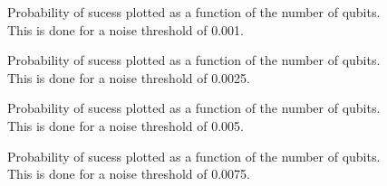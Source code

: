 
\begin{figure}
\begin{center}
\end{center}
\caption{Probability of sucess plotted as a function of the number of qubits. This
is done for a noise threshold of 0.001.}
\end{figure}

\pagebreak

\begin{figure}
\begin{center}
\end{center}
\caption{Probability of sucess plotted as a function of the number of qubits. This
is done for a noise threshold of 0.0025.}
\end{figure}

\pagebreak

\begin{figure}
\begin{center}
\end{center}
\caption{Probability of sucess plotted as a function of the number of qubits. This
is done for a noise threshold of 0.005.}
\end{figure}

\pagebreak

\begin{figure}
\begin{center}
\end{center}
\caption{Probability of sucess plotted as a function of the number of qubits. This
is done for a noise threshold of 0.0075.}
\end{figure}




